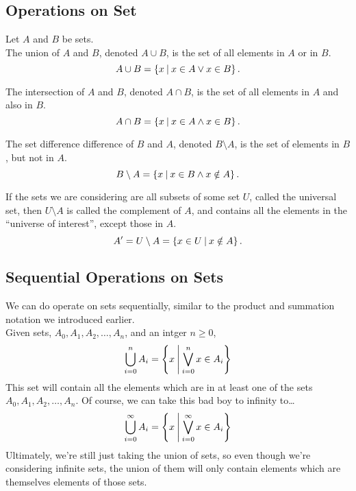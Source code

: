 \documentclass{report}
\begin{document}
\subsection*{Operations on Set}
Let $A$ and $B$ be sets. \\

The union of $A$ and $B$, denoted $A\cup B$, is the set of all elements in $A$ or in $B$.
$$
	A\cup B = \left\lbrace x \medspace\middle|\medspace x\in A \lor x\in B \right\rbrace.
$$

The intersection of $A$ and $B$, denoted $A\cap B$, is the set of all elements in $A$ and also in $B$.
$$
	A\cap B = \left\lbrace x \medspace\middle|\medspace x\in A \land x\in B \right\rbrace.
$$

The set difference difference of $B$ and $A$, denoted $B\setminus A$, is the set of elements in $B$, but not in $A$.
$$
	B\setminus A = \left\lbrace x\medspace\middle|\medspace x\in B \land x\notin A \right\rbrace.
$$

If the sets we are considering are all subsets of some set $U$, called the universal set, then $U\setminus A$ is called the complement of $A$, and contains all the elements in the ``universe of interest'', except those in $A$.
$$
	A' = U \setminus A = \left\lbrace x\in U\medspace\middle|\medspace x\notin A \right\rbrace.
$$

\subsection*{Sequential Operations on Sets}
We can do operate on sets sequentially, similar to the product and summation notation we introduced earlier. \\
Given sets, $A_0, A_1, A_2, \dots, A_n$, and an intger $n\geq0$,
$$
	\bigcup_{i=0}^{n}A_i = \left\lbrace x\medspace\middle|\medspace \bigvee_{i=0}^{n} x\in A_i \right\rbrace
$$
This set will contain all the elements which are in at least one of the sets $A_0, A_1, A_2, \dots, A_n$. Of course, we can take this bad boy to infinity to\dots
$$
	\bigcup_{i=0}^{\infty}A_i = \left\lbrace x\medspace\middle|\medspace \bigvee_{i=0}^{\infty} x\in A_i \right\rbrace
$$
Ultimately, we're still just taking the union of sets, so even though we're considering infinite sets, the union of them will only contain elements which are themselves elements of those sets. \\
\end{document}
